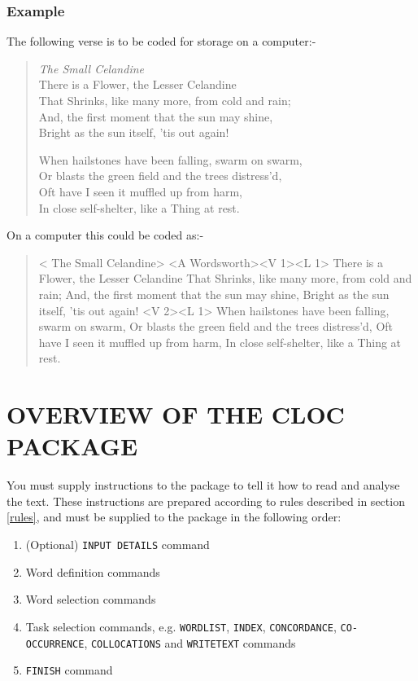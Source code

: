 \subsubsection{Example}
The following verse is to be coded for storage on a computer:-
\begin{verse}
{\em The Small Celandine}\\
There is a Flower, the Lesser Celandine\\
That Shrinks, like many more, from cold and rain;\\
And, the first moment that the sun may shine,\\
Bright as the sun itself, 'tis out again!

When hailstones have been falling, swarm on swarm,\\
Or blasts the green field and the trees distress'd,\\
Oft have I seen it muffled up from harm,\\
In close self-shelter, like a Thing at rest.
\end{verse}

On a computer this could be coded as:-
\begin{quote}
\begin{verbatim*}
<  The Small Celandine>
<A Wordsworth><V 1><L 1>
There is a Flower, the Lesser Celandine
That Shrinks, like many more, from cold and rain;
And, the first moment that the sun may shine,
Bright as the sun itself, 'tis out again!
<V 2><L 1>
When hailstones have been falling, swarm on swarm,
Or blasts the green field and the trees distress'd,
Oft have I seen it muffled up from harm,
In close self-shelter, like a Thing at rest.
\end{verbatim*}
\end{quote}

\section{OVERVIEW OF THE CLOC PACKAGE}
You must supply instructions to the package to tell it how to
read and analyse the text.  These instructions are prepared
according to rules described in section \ref{rules}, and
must be supplied to the package in the following order:

\begin{enumerate}
\item (Optional) \verb/INPUT DETAILS/ command
\item Word definition commands
\item Word selection commands
\item Task selection commands, e.g. \verb/WORDLIST/, \verb/INDEX/,
      \verb/CONCORDANCE/,
      \verb/CO-OCCURRENCE/, \verb/COLLOCATIONS/ and \verb/WRITETEXT/ commands
\item \verb/FINISH/ command
\end{enumerate}

